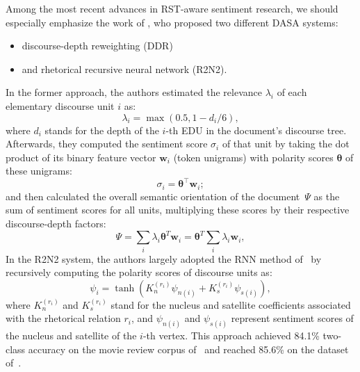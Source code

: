 
Among the most recent advances in RST-aware sentiment research, we
should especially emphasize the work of , who
proposed two different DASA systems:
\begin{itemize}
\item discourse-depth reweighting (DDR)
\item and rhetorical recursive neural network (R2N2).
\end{itemize}
In the former approach, the authors estimated the relevance
$\lambda_i$ of each elementary discourse unit $i$ as:
\begin{equation*}
  \lambda_i = \max\left(0.5, 1 - d_i/6\right),
\end{equation*}
where $d_i$ stands for the depth of the $i$-th EDU in the document's
discourse tree.  Afterwards, they computed the sentiment score
$\sigma_i$ of that unit by taking the dot product of its binary
feature vector $\mathbf{w}_i$ (token unigrams) with polarity scores
$\boldsymbol{\theta}$ of these unigrams:
\begin{equation*}
  \sigma_i = \boldsymbol{\theta}^{\top}\mathbf{w}_i;
\end{equation*}
and then calculated the overall semantic orientation of the
document~$\Psi$ as the sum of sentiment scores for all units,
multiplying these scores by their respective discourse-depth factors:
\begin{equation*}
  \Psi = \sum_i\lambda_i\boldsymbol{\theta}^T\mathbf{w}_i = \boldsymbol{\theta}^T\sum_i\lambda_i\mathbf{w}_i,
\end{equation*}
In the R2N2 system, the authors largely adopted the RNN method
of~ by recursively computing the polarity scores of
discourse units as:
\begin{equation*}
  \psi_i = \tanh\left(K_n^{(r_i)} \psi_{n(i)} + K_s^{(r_i)}\psi_{s(i)} \right),
\end{equation*}
where $K_n^{(r_i)}$ and $K_s^{(r_i)}$ stand for the nucleus and
satellite coefficients associated with the rhetorical relation $r_i$,
and $\psi_{n(i)}$ and $\psi_{s(i)}$ represent sentiment scores of the
nucleus and satellite of the $i$-th vertex.  This approach achieved
84.1\% two-class accuracy on the movie review corpus
of~ and reached 85.6\% on the dataset
of~.

